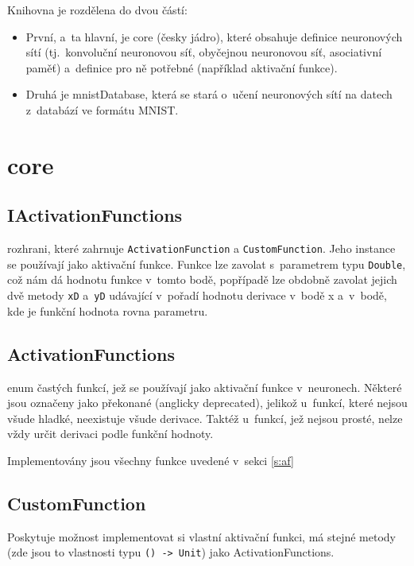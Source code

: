 \documentclass[12pt]{report}			%
\begin{document}
			
			
			Knihovna je rozdělena do dvou částí:
			\begin{itemize}
				\item První, a~ta hlavní, je core (česky jádro), které obsahuje definice neuronových sítí (tj.~konvoluční neuronovou síť, obyčejnou neuronovou síť, asociativní paměť) a~definice pro ně potřebné (například aktivační funkce).
				\item Druhá je mnistDatabase, která se stará o~učení neuronových sítí na datech z~databází ve formátu MNIST.
			\end{itemize}
			
			\section{core}
			
				\subsection{IActivationFunctions}
					\Gls{rozhrani}, které zahrnuje \verb!ActivationFunction! a \verb!CustomFunction!. Jeho instance se používají jako aktivační funkce. Funkce lze zavolat s~parametrem \gls{typ}u \verb!Double!, což nám dá hodnotu funkce v~tomto bodě, popřípadě lze obdobně zavolat jejich dvě metody \verb!xD! a~\verb!yD! udávající v~pořadí hodnotu derivace v~bodě x a~v~bodě, kde je funkční hodnota rovna parametru.
			
				\subsection{ActivationFunctions}
					\Gls{enum} častých funkcí, jež se používají jako aktivační funkce v~neuronech. Některé jsou označeny jako překonané (anglicky deprecated), jelikož u~funkcí, které nejsou všude hladké, neexistuje všude derivace. Taktéž u~funkcí, jež nejsou prosté, nelze vždy určit derivaci podle funkční hodnoty.
					
					Implementovány jsou všechny funkce uvedené v~sekci \ref{s:af}
					
				\subsection{CustomFunction}
					Poskytuje možnost implementovat si vlastní aktivační funkci, má stejné metody (zde jsou to vlastnosti \gls{typ}u \verb!() -> Unit!) jako ActivationFunctions.
			
\end{document}
